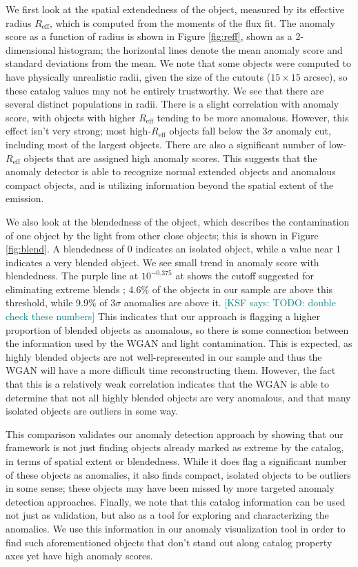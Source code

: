 \documentclass[fleqn,usenatbib,useAMS]{mnras}
\newcommand{\KSF}[1]{\textcolor{teal}{{[KSF says: #1]}}}
\begin{document}
We first look at the spatial extendedness of the object, measured by its effective radius $R_\mathrm{eff}$, which is computed from the moments of the flux fit.
The anomaly score as a function of radius is shown in Figure \ref{fig:reff}, shown as a 2-dimensional histogram; the horizontal lines denote the mean anomaly score and standard deviations from the mean.
We note that some objects were computed to have physically unrealistic radii, given the size of the cutouts ($15 \times 15$ arcsec), so these catalog values may not be entirely trustworthy.
We see that there are several distinct populations in radii.
There is a slight correlation with anomaly score, with objects with higher $R_\mathrm{eff}$ tending to be more anomalous.
However, this effect isn't very strong; most high-$R_\mathrm{eff}$ objects fall below the $3\sigma$ anomaly cut, including most of the largest objects.
There are also a significant number of low-$R_\mathrm{eff}$ objects that are assigned high anomaly scores.
This suggests that the anomaly detector is able to recognize normal extended objects and anomalous compact objects, and is utilizing information beyond the spatial extent of the emission.

We also look at the blendedness of the object, which describes the contamination of one object by the light from other close objects; this is shown in Figure \ref{fig:blend}.
A blendedness of 0 indicates an isolated object, while a value near 1 indicates a very blended object.
We see small trend in anomaly score with blendedness.
The purple line at $10^{-0.375}$ at shows the cutoff suggested for eliminating extreme blends \citep{Mandelbaum2018}; 4.6\% of the objects in our sample are above this threshold, while 9.9\% of $3\sigma$ anomalies are above it. \KSF{TODO: double check these numbers}
This indicates that our approach is flagging a higher proportion of blended objects as anomalous, so there is some connection between the information used by the WGAN and light contamination.
This is expected, as highly blended objects are not well-represented in our sample and thus the WGAN will have a more difficult time reconstructing them.
However, the fact that this is a relatively weak correlation indicates that the WGAN is able to determine that not all highly blended objects are very anomalous, and that many isolated objects are outliers in some way.

This comparison validates our anomaly detection approach by showing that our framework is not just finding objects already marked as extreme by the catalog, in terms of spatial extent or blendedness.
While it does flag a significant number of these objects as anomalies, it also finds compact, isolated objects to be outliers in some sense; these objects may have been missed by more targeted anomaly detection approaches.
Finally, we note that this catalog information can be used not just as validation, but also as a tool for exploring and characterizing the anomalies.
We use this information in our anomaly visualization tool in order to find such aforementioned objects that don't stand out along catalog property axes yet have high anomaly scores.
\end{document}

